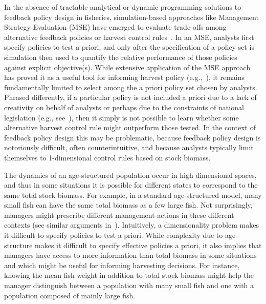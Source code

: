 \documentclass[floatfix,nofootinbib,longbibliography,notitlepage]{revtex4-2}
\def\eg{e.g.}
\begin{document}
In the absence of tractable analytical or dynamic programming solutions to feedback policy design in fisheries, simulation-based approaches like Management Strategy Evaluation (MSE) have emerged to evaluate trade-offs among alternative feedback policies or harvest control rules~\cite{punt-mse}.
In an MSE, analysts first specify policies to test a priori, and only after the specification of a policy set is simulation then used to quantify the relative performance of those policies against explicit objective(s).
While extensive application of the MSE approach has proved it as a useful tool for informing harvest policy (\eg,~\cite{edwards2016-mse}), it remains fundamentally limited to select among the a priori policy set chosen by analysts.  
Phrased differently, if a particular policy is not included a priori due to a lack of creativity on behalf of analysts or perhaps due to the constraints of national legislation (\eg, see~\cite{dfo2006}), then it simply is not possible to learn whether some alternative harvest control rule might outperform those tested.  
In the context of feedback policy design this may be problematic, because feedback policy design is notoriously difficult, often counterintuitive, and because analysts typically limit themselves to 1-dimensional control rules based on stock biomass. 
	
The dynamics  of an age-structured population occur in  high dimensional spaces, and thus in some situations it is possible for different states to correspond to the same total stock biomass.  
For example, in a standard  age-structured model, many small fish can have the same total biomass as a few large fish. 
Not surprisingly, managers might prescribe different management actions  in  these different contexts (see similar arguments in~\cite{hilborn2002}). 
Intuitively, a dimensionality problem makes it difficult  to specify policies to test a priori. 
While complexity due to age-structure makes it difficult to specify effective policies a priori, it also implies that  managers have access to more information than total biomass in some situations and which might be useful for informing harvesting decisions. 
For instance, knowing the mean fish weight in addition to total stock biomass might help the manager distinguish between a population with many small fish and one with a population composed of mainly large fish. 
	
\end{document}
